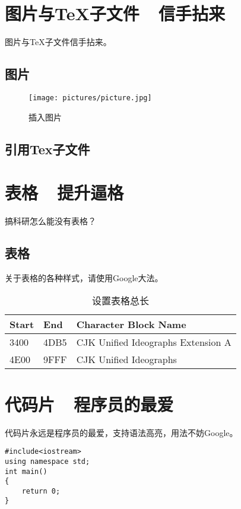 

\section{图片与TeX子文件\ \ 信手拈来}

图片与TeX子文件信手拈来。

\subsection{图片}

\begin{figure}
    \centering
    \texttt{[image: pictures/picture.jpg]}
    \caption{插入图片}
\end{figure}

\subsection{引用Tex子文件}






\clearpage
\section{表格\ \ 提升逼格}

搞科研怎么能没有表格？\\

\subsection{表格}

关于表格的各种样式，请使用Google大法。\\
\begin{table}[H]
\caption{设置表格总长} 
\begin{tabular*}{12cm}{lll}
\hline  
Start & End  & Character Block Name \\  
\hline  
3400  & 4DB5 & CJK Unified Ideographs Extension A \\  
4E00  & 9FFF & CJK Unified Ideographs \\  
\hline  
\end{tabular*} 
\end{table} 



\section{代码片\ \ 程序员的最爱}
代码片永远是程序员的最爱，支持语法高亮，用法不妨Google。\\
\lstset{language=C}
\begin{lstlisting}
#include<iostream>
using namespace std;
int main()
{
    return 0;
}
\end{lstlisting}

